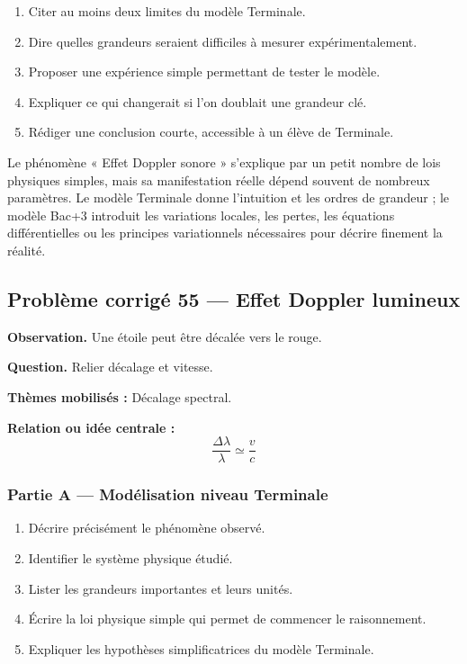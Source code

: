\documentclass[11pt,a4paper]{article}
\begin{document}
\begin{enumerate}
  \item Citer au moins deux limites du modèle Terminale.
  \item Dire quelles grandeurs seraient difficiles à mesurer expérimentalement.
  \item Proposer une expérience simple permettant de tester le modèle.
  \item Expliquer ce qui changerait si l'on doublait une grandeur clé.
  \item Rédiger une conclusion courte, accessible à un élève de Terminale.
\end{enumerate}

\begin{corrigebox}
Le phénomène « Effet Doppler sonore » s'explique par un petit nombre de lois physiques simples, mais sa manifestation réelle dépend souvent de nombreux paramètres. Le modèle Terminale donne l'intuition et les ordres de grandeur ; le modèle Bac+3 introduit les variations locales, les pertes, les équations différentielles ou les principes variationnels nécessaires pour décrire finement la réalité.
\end{corrigebox}

\subsection{Problème corrigé 55 — Effet Doppler lumineux}

\begin{exercicebox}
\textbf{Observation.} Une étoile peut être décalée vers le rouge.

\medskip
\textbf{Question.} Relier décalage et vitesse.

\medskip
\textbf{Thèmes mobilisés :} Décalage spectral.

\medskip
\textbf{Relation ou idée centrale :}
\[
\frac{\Delta\lambda}{\lambda}\simeq\frac{v}{c}
\]
\end{exercicebox}

\subsubsection*{Partie A — Modélisation niveau Terminale}

\begin{enumerate}
  \item Décrire précisément le phénomène observé.
  \item Identifier le système physique étudié.
  \item Lister les grandeurs importantes et leurs unités.
  \item Écrire la loi physique simple qui permet de commencer le raisonnement.
  \item Expliquer les hypothèses simplificatrices du modèle Terminale.
\end{enumerate}
\end{document}
